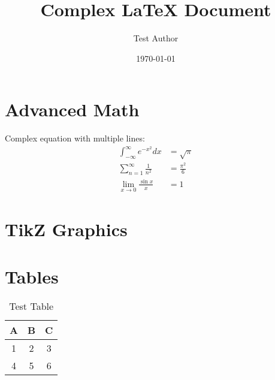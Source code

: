 \documentclass{extarticle}
\title{Complex LaTeX Document}
\author{Test Author}
\date{\today}
\begin{document}
\maketitle

\section{Advanced Math}
Complex equation with multiple lines:
\begin{align}
    \int_{-\infty}^{\infty} e^{-x^2} dx &= \sqrt{\pi} \\
    \sum_{n=1}^{\infty} \frac{1}{n^2} &= \frac{\pi^2}{6} \\
    \lim_{x \to 0} \frac{\sin x}{x} &= 1
\end{align}

\section{TikZ Graphics}

\section{Tables}
\begin{table}[h]
    \centering
    \begin{tabular}{|c|c|c|}
        \hline
        A & B & C \\
        \hline
        1 & 2 & 3 \\
        4 & 5 & 6 \\
        \hline
    \end{tabular}
    \caption{Test Table}
\end{table}
\end{document}
